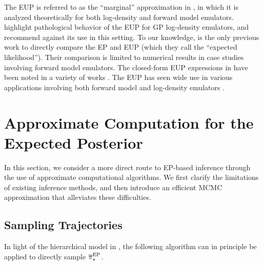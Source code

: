 \documentclass[12pt]{article}
\begin{document}
The EUP is referred to as the ``marginal'' approximation in 
\citet{StuartTeck1,StuartTeck2,random_fwd_models,TeckHyperpar},
in which it is analyzed theoretically for both log-density and forward 
model emulators. \citet{VehtariParallelGP} highlight pathological 
behavior of the EUP for GP log-density emulators, and recommend 
against its use in this setting. To our knowledge, \citet{BurknerSurrogate}
is the only previous work to directly compare the EP and EUP (which 
they call the ``expected likelihood''). Their comparison is limited to 
numerical results in case studies involving forward model emulators.
The closed-form EUP expressions in 
 have been 
noted in a variety of works 
\citep{StuartTeck1,StuartTeck2,VehtariParallelGP,weightedIVAR,
GP_PDE_priors,Surer2023sequential,Takhtaganov2018AdaptiveBayesianGP}. 
The EUP has seen wide 
use in various applications involving both forward model 
and log-density emulators 
\citep{weightedIVAR,GP_PDE_priors,CES,idealizedGCM,
villani2024posteriorsamplingadaptivegaussian,hydrologicalModel,hydrologicalModel2}.
 
\section{Approximate Computation for the Expected Posterior} \label{sec:computation}
In this section, we consider a more direct route to EP-based inference through
the use of approximate computational algorithms. 
We first clarify the limitations of existing inference methods, 
and then introduce an efficient MCMC approximation that alleviates 
these difficulties.

\subsection{Sampling Trajectories}
In light of the hierarchical model in , the following 
algorithm can in principle be applied to directly sample ${\overline{\pi}}_{\star}^{\mathrm{EP}}$.  
\end{document}
